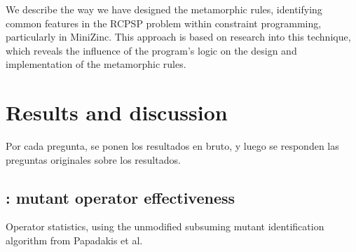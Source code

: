 We describe the way we have designed the metamorphic rules,
identifying common features in the RCPSP problem within constraint
programming, particularly in MiniZinc. This approach is based on
research into this technique, which reveals the influence of the
program's logic on the design and implementation of the metamorphic
rules.




\iffalse

Explicar cómo se van a responder esas research questions: programas MiniZinc seleccionados, conjuntos de pruebas iniciales seleccionados, cuántos mutantes salen de esos programas y cuántos son equivalentes (explicando cómo se detectaron los equivalentes), qué se va a medir (mutantes muertos por el conjunto inicial y por las pruebas producidas por las reglas metamórficas).

\fi



\section{Results and discussion}

Por cada pregunta, se ponen los resultados en bruto, y luego se responden las preguntas originales sobre los resultados.

\subsection{\rqoperators: mutant operator effectiveness}

\begin{table}
    \centering
    
    \caption{Operator statistics, using the unmodified subsuming mutant identification algorithm from Papadakis et al.~\cite{papadakis_threats_2016}}
    \label{tab:opstats-nodups}
\end{table}

